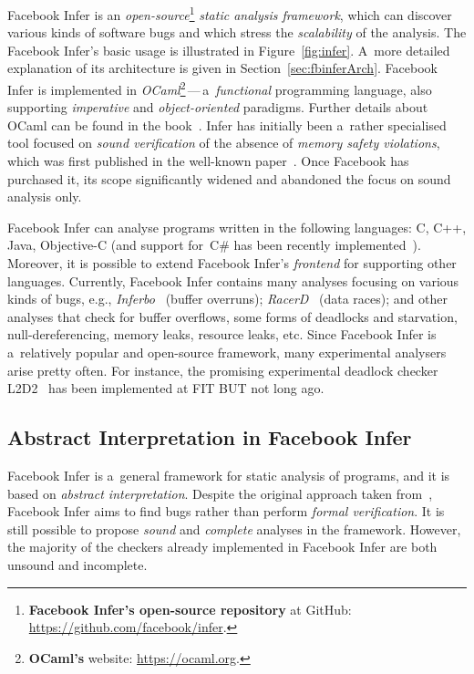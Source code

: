 Facebook Infer is an \emph{open-source}\footnote{\textbf{Facebook Infer's open-source repository} at GitHub: \url{https://github.com/facebook/infer}.} \emph{static analysis framework}, which can discover various kinds of software bugs and which stress the \emph{scalability} of the analysis. The Facebook Infer's basic usage is illustrated in Figure~\ref{fig:infer}. A~more detailed explanation of its architecture is given in Section~\ref{sec:fbinferArch}. Facebook Infer is implemented in \emph{OCaml}\footnote{\textbf{OCaml's} website: \url{https://ocaml.org}.}\,---\,a~\emph{functional} programming language, also supporting \emph{imperative} and \emph{object-oriented} paradigms. Further details about OCaml can be found in the book~\cite{realWorldOCaml}. Infer has initially been a~rather specialised tool focused on \emph{sound verification} of the absence of \emph{memory safety violations}, which was first published in the well-known paper~\cite{inferBiabduction}. Once Facebook has purchased it, its scope significantly widened and abandoned the focus on sound analysis only.

Facebook Infer can analyse programs written in the following languages: C, C++, Java, Objective-C (and support for~C\# has been recently implemented~\cite{inferCSharp}). Moreover, it is possible to extend Facebook Infer's \emph{frontend} for supporting other languages. Currently, Facebook Infer contains many analyses focusing on various kinds of bugs, e.g., \emph{Inferbo}~\cite{inferboOnline} (buffer overruns); \emph{RacerD}~\cite{racerD, racerDOnline, staticRaceDetectorTruePositives} (data races); and other analyses that check for buffer overflows, some forms of deadlocks and starvation, null-dereferencing, memory leaks, resource leaks, etc. Since Facebook Infer is a~relatively popular and open-source framework, many experimental analysers arise pretty often. For instance, the promising experimental deadlock checker L2D2~\cite{marcinBP} has been implemented at FIT BUT not long ago.

\subsection{Abstract Interpretation in Facebook Infer}
\label{sec:fbinferAI}

Facebook Infer is a~general framework for static analysis of programs, and it is based on \emph{abstract interpretation}. Despite the original approach taken from~\cite{inferBiabduction}, Facebook Infer aims to find bugs rather than perform \emph{formal verification}. It is still possible to propose \emph{sound} and \emph{complete} analyses in the framework. However, the majority of the checkers already implemented in Facebook Infer are both unsound and incomplete.

